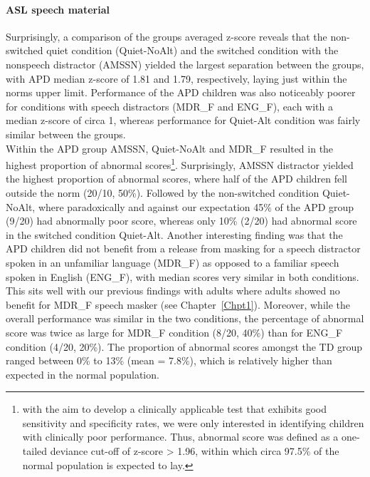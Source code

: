 \documentclass[a4paper, twoside]{templates/ociamthesis}
\begin{document}
\hypertarget{asl-speech-material}{%
\paragraph*{ASL speech material}\label{asl-speech-material}}

\hfill\break
Surprisingly, a comparison of the groups averaged z-score reveals that the non-switched quiet condition (Quiet-NoAlt) and the switched condition with the nonspeech distractor (AMSSN) yielded the largest separation between the groups, with APD median z-score of 1.81 and 1.79, respectively, laying just within the norms upper limit. Performance of the APD children was also noticeably poorer for conditions with speech distractors (MDR\_F and ENG\_F), each with a median z-score of circa 1, whereas performance for Quiet-Alt condition was fairly similar between the groups.\\

Within the APD group AMSSN, Quiet-NoAlt and MDR\_F resulted in the highest proportion of abnormal scores\footnote{with the aim to develop a clinically applicable test that exhibits good sensitivity and specificity rates, we were only interested in identifying children with clinically poor performance. Thus, abnormal score was defined as a one-tailed deviance cut-off of z-score \textgreater{} 1.96, within which circa 97.5\% of the normal population is expected to lay.}. Surprisingly, AMSSN distractor yielded the highest proportion of abnormal scores, where half of the APD children fell outside the norm (20/10, 50\%). Followed by the non-switched condition Quiet-NoAlt, where paradoxically and against our expectation 45\% of the APD group (9/20) had abnormally poor score, whereas only 10\% (2/20) had abnormal score in the switched condition Quiet-Alt. Another interesting finding was that the APD children did not benefit from a release from masking for a speech distractor spoken in an unfamiliar language (MDR\_F) as opposed to a familiar speech spoken in English (ENG\_F), with median scores very similar in both conditions. This sits well with our previous findings with adults where adults showed no benefit for MDR\_F speech masker (see Chapter~\ref{Chpt1}). Moreover, while the overall performance was similar in the two conditions, the percentage of abnormal score was twice as large for MDR\_F condition (8/20, 40\%) than for ENG\_F condition (4/20, 20\%). The proportion of abnormal scores amongst the TD group ranged between 0\% to 13\% (mean = 7.8\%), which is relatively higher than expected in the normal population.\\
\end{document}
